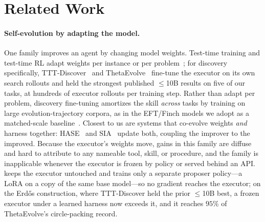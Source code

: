 \section{Related Work}
\label{sec:related}

\paragraph{Self-evolution by adapting the model.}  One family improves an agent
by changing model weights.  Test-time training and test-time RL adapt weights
per instance or per problem~\citep{ttt,ttrl,s1}; for discovery specifically,
TTT-Discover~\citep{tttdiscover} and ThetaEvolve~\citep{thetaevolve} fine-tune
the executor on its own search rollouts and held the strongest published
$\le$10B results on five of our tasks, at hundreds of executor rollouts per
training step.  Rather than adapt per problem, discovery fine-tuning amortizes
the skill \emph{across} tasks by training on large evolution-trajectory corpora,
as in the EFT/Finch models we adopt as a matched-scale baseline~\citep{finch}.
Closest to us are systems that co-evolve weights \emph{and} harness together:
HASE~\citep{hase} and SIA~\citep{sia} update both, coupling the improver to the
improved.  Because the executor's weights move, gains in this family are diffuse
and hard to attribute to any nameable tool, skill, or procedure, and the family
is inapplicable whenever the executor is frozen by policy or served behind an
API.  \method{} keeps the executor untouched and trains only a separate proposer
policy---a LoRA on a copy of the same base model---so no gradient reaches the
executor; on the Erd\H{o}s construction, where TTT-Discover held the prior $\le$10B
best, a frozen executor under a learned harness now exceeds it, and it
reaches $95\%$ of ThetaEvolve's circle-packing record.

